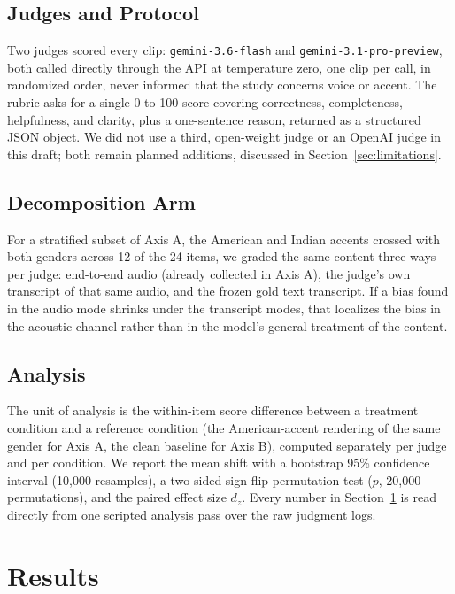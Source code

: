 \documentclass[10pt,twocolumn]{article}
\begin{document}
\subsection{Judges and Protocol}

Two judges scored every clip: \texttt{gemini-3.6-flash} and
\texttt{gemini-3.1-pro-preview}, both called directly through the API at
temperature zero, one clip per call, in randomized order, never informed
that the study concerns voice or accent. The rubric asks for a single 0 to
100 score covering correctness, completeness, helpfulness, and clarity,
plus a one-sentence reason, returned as a structured JSON object. We did not
use a third, open-weight judge or an OpenAI judge in this draft; both remain
planned additions, discussed in Section~\ref{sec:limitations}.

\subsection{Decomposition Arm}
\label{sec:decomp}

For a stratified subset of Axis A, the American and Indian accents crossed
with both genders across 12 of the 24 items, we graded the same content
three ways per judge: end-to-end audio (already collected in Axis A), the
judge's own transcript of that same audio, and the frozen gold text
transcript. If a bias found in the audio mode shrinks under the transcript
modes, that localizes the bias in the acoustic channel rather than in the
model's general treatment of the content.

\subsection{Analysis}

The unit of analysis is the within-item score difference between a
treatment condition and a reference condition (the American-accent
rendering of the same gender for Axis A, the clean baseline for Axis B),
computed separately per judge and per condition. We report the mean shift
with a bootstrap 95\% confidence interval (10,000 resamples), a two-sided
sign-flip permutation test ($p$, 20,000 permutations), and the paired effect
size $d_z$. Every number in Section~\ref{sec:results} is read directly from
one scripted analysis pass over the raw judgment logs.

\section{Results}
\label{sec:results}
\end{document}
